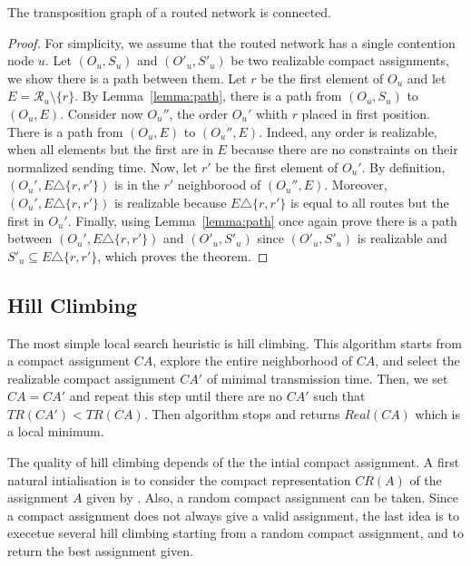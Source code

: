  \begin{theorem}
 The transposition graph of a routed network is connected.
 \end{theorem}
 \begin{proof}
 For simplicity, we assume that the routed network has a single contention node $u$. Let $(O_u,S_u)$ and $(O'_u,S'_u)$ be two realizable compact assignments, we show there is a path between them. Let $r$ be the first element of 
$O_u$ and let $E = \mathcal{R}_u \setminus \{ r \}$. By Lemma~\ref{lemma:path}, there is a path from 
$(O_u,S_u)$ to $(O_u,E)$. Consider now $O_u''$, the order $O_u'$ whith $r$ placed in first position.
There is a path from $(O_u,E)$ to $(O_u'',E)$. Indeed, any order is realizable, when all elements but the first
are in $E$ because there are no constraints on their normalized sending time. 
Now, let $r'$ be the first element of $O_u'$. By definition, $(O_u',E \triangle \{r,r'\})$ is in the $r'$ neighborood of $(O_u'',E)$. Moreover, $(O_u',E \triangle \{r,r'\})$ is realizable because $E \triangle \{r,r'\}$ is equal to all routes but the first in $O_u'$. 
Finally, using Lemma~\ref{lemma:path} once again prove there is a path between $(O_u',E \triangle \{r,r'\})$ and $(O'_u,S'_u)$ since $(O'_u,S'_u)$ is realizable and $S'_u \subseteq E \triangle \{r,r'\}$, which proves the theorem.
 \end{proof}




\subsection{Hill Climbing}

The most simple local search heuristic is hill climbing. This algorithm starts from a compact assignment $CA$, explore the entire neighborhood of $CA$, and select the realizable compact assignment $CA'$ of minimal transmission time. Then, we set $CA = CA'$ and repeat this step until there are no $CA'$ such that $TR(CA') < TR(CA)$. Then algorithm stops and returns $Real(CA)$ which is a local minimum. 

The quality of hill climbing depends of the the intial compact assignment. A first natural intialisation is to consider the compact representation $CR(A)$ of the assignment $A$ given by \hybridgreedynormalized. Also, a random compact assignment can be taken. Since a compact assignment does not always give a valid assignment, the last idea is to execetue several hill climbing starting from a random compact assignment, and to return the best assignment given.

